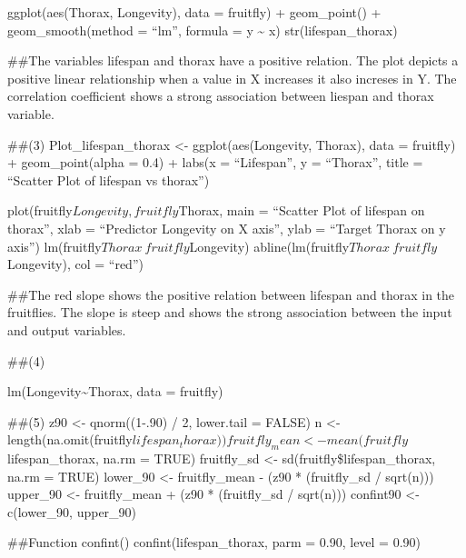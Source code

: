 \documentclass[
]{article}
\begin{document}
ggplot(aes(Thorax, Longevity), data = fruitfly) + geom\_point() +
geom\_smooth(method = ``lm'', formula = y \textasciitilde{} x)
str(lifespan\_thorax)

\#\#The variables lifespan and thorax have a positive relation. The plot
depicts a positive linear relationship when a value in X increases it
also increses in Y. The correlation coefficient shows a strong
association between liespan and thorax variable.

\#\#(3) Plot\_lifespan\_thorax \textless- ggplot(aes(Longevity, Thorax),
data = fruitfly) + geom\_point(alpha = 0.4) + labs(x = ``Lifespan'', y =
``Thorax'', title = ``Scatter Plot of lifespan vs thorax'')

plot(fruitfly\(Longevity, fruitfly\)Thorax, main = ``Scatter Plot of
lifespan on thorax'', xlab = ``Predictor Longevity on X axis'', ylab =
``Target Thorax on y axis'') lm(fruitfly\(Thorax ~ fruitfly\)Longevity)
abline(lm(fruitfly\(Thorax ~ fruitfly\)Longevity), col = ``red'')

\#\#The red slope shows the positive relation between lifespan and
thorax in the fruitflies. The slope is steep and shows the strong
association between the input and output variables.

\#\#(4)

lm(Longevity\textasciitilde Thorax, data = fruitfly)

\#\#(5) z90 \textless- qnorm((1-.90) / 2, lower.tail = FALSE) n
\textless-
length(na.omit(fruitfly\(lifespan_thorax)) fruitfly_mean <- mean(fruitfly\)lifespan\_thorax,
na.rm = TRUE) fruitfly\_sd \textless- sd(fruitfly\$lifespan\_thorax,
na.rm = TRUE) lower\_90 \textless- fruitfly\_mean - (z90 * (fruitfly\_sd
/ sqrt(n))) upper\_90 \textless- fruitfly\_mean + (z90 * (fruitfly\_sd /
sqrt(n))) confint90 \textless- c(lower\_90, upper\_90)

\#\#Function confint() confint(lifespan\_thorax, parm = 0.90, level =
0.90)
\end{document}
